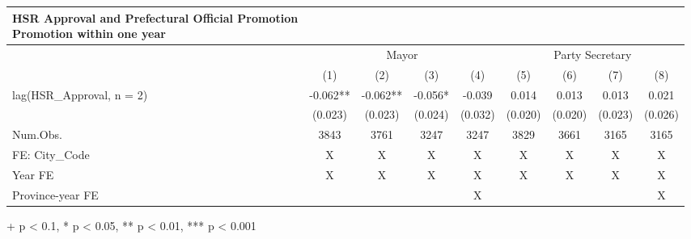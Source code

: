 \setlength{\LTpost}{0mm}
\begin{longtable}{lcccccccc}
\caption*{
{\large HSR Approval and Prefectural Official Promotion} \\ 
{\small Promotion within one year}
} \\ 
\toprule
 & \multicolumn{4}{c}{Mayor} & \multicolumn{4}{c}{Party Secretary} \\ 
\cmidrule(lr){2-5} \cmidrule(lr){6-9}
  & (1) & (2) & (3) & (4) & (5) & (6) & (7) & (8) \\ 
\midrule
lag(HSR\_Approval, n = 2) & -0.062** & -0.062** & -0.056* & -0.039 & 0.014 & 0.013 & 0.013 & 0.021 \\ 
 & (0.023) & (0.023) & (0.024) & (0.032) & (0.020) & (0.020) & (0.023) & (0.026) \\ 
Num.Obs. & 3843 & 3761 & 3247 & 3247 & 3829 & 3661 & 3165 & 3165 \\ 
FE: City\_Code & X & X & X & X & X & X & X & X \\ 
Year FE & X & X & X & X & X & X & X & X \\ 
Province-year FE &  &  &  & X &  &  &  & X \\ 
\bottomrule
\end{longtable}
\begin{minipage}{\linewidth}
+ p < 0.1, * p < 0.05, ** p < 0.01, *** p < 0.001\\
\end{minipage}

